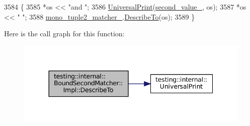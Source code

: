 \begin{DoxyCode}
3584                                                   \{
3585       *os << \textcolor{stringliteral}{"and "};
3586       \hyperlink{namespacetesting_1_1internal_a30708fa2bacf11895b03bdb21eb72309}{UniversalPrint}(\hyperlink{classtesting_1_1internal_1_1BoundSecondMatcher_1_1Impl_a240ffac4b65c0fd361d8ff85dca35564}{second\_value\_}, os);
3587       *os << \textcolor{stringliteral}{" "};
3588       \hyperlink{classtesting_1_1internal_1_1BoundSecondMatcher_1_1Impl_a7b9610e5665d65f2837eb7e3121c7775}{mono\_tuple2\_matcher\_}.\hyperlink{classtesting_1_1internal_1_1MatcherBase_a7e0c883c7745e0d646463077ef1c1267}{DescribeTo}(os);
3589     \}
\end{DoxyCode}
Here is the call graph for this function\+:
\nopagebreak
\begin{figure}[H]
\begin{center}
\leavevmode
\includegraphics[width=344pt]{classtesting_1_1internal_1_1BoundSecondMatcher_1_1Impl_ada7c4fd01c568c48f929dc34b3281aff_cgraph}
\end{center}
\end{figure}
\mbox{\label{classtesting_1_1internal_1_1BoundSecondMatcher_1_1Impl_ab1dc41e523e3dd24715ef759f2415626}} 
